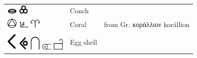 \documentclass[british,final,landscape]{scrartcl}
\begin{document}
\begin{refsection}
\begin{supertabular}{p{0.3\textwidth}p{0.34\textwidth}p{0.34\textwidth}}
   \includegraphics[width=5mm]{Animal/Conch} \includegraphics[width=5mm]{Animal/Conch2} & Conch & \\
   \includegraphics[width=5mm]{Animal/Coral} \includegraphics[width=5mm]{Animal/Coral2} \includegraphics[width=5mm]{Animal/Coral3} & Coral & from Gr. \foreignlanguage{greek}{κοράλλιον} korállion \\
   \includegraphics[width=5mm]{Animal/EggShell} \includegraphics[width=5mm]{Animal/EggShell2} \includegraphics[width=5mm]{Animal/EggShell3} \includegraphics[width=5mm]{Animal/EggShell4} \includegraphics[width=5mm]{Animal/EggShell5} & Egg shell & \\

\end{supertabular}
\end{refsection}
\end{document}
